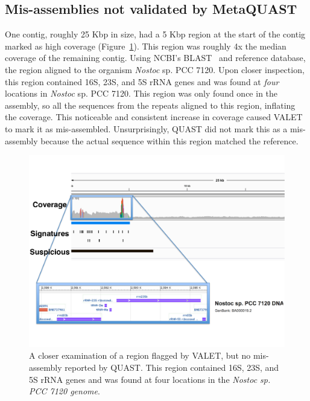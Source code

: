 \documentclass{article}
\begin{document}
\subsection{Mis-assemblies not validated by MetaQUAST}
One contig, roughly 25 Kbp in size, had a 5 Kbp region at the start of the contig marked as high coverage (Figure~\ref{fig:rrna_coverages}).
This region was roughly 4x the median coverage of the remaining contig.
Using NCBI's BLAST~\citep{BLAST} and reference database, the region aligned to the organism \emph{Nostoc} sp. PCC 7120.
Upon closer inspection, this region contained 16S, 23S, and 5S rRNA genes and was found at \emph{four} locations in \emph{Nostoc} sp. PCC 7120.
This region was only found once in the assembly, so all the sequences from the repeats aligned to this region, inflating the coverage.
This noticeable and consistent increase in coverage caused VALET to mark it as mis-assembled.
Unsurprisingly, QUAST did not mark this as a mis-assembly because the actual sequence within this region matched the reference.

\begin{figure}[tb!]
\begin{center}
\includegraphics[width=\textwidth]{figures/rrna_coverages}
\end{center}
\caption[16S_rrna]{A closer examination of a region flagged by VALET, but no mis-assembly reported by QUAST. This region contained 16S, 23S, and 5S rRNA genes and was found at four locations in the \emph{Nostoc sp. PCC 7120 genome}.}
\label{fig:rrna_coverages}
\end{figure}
\end{document}
